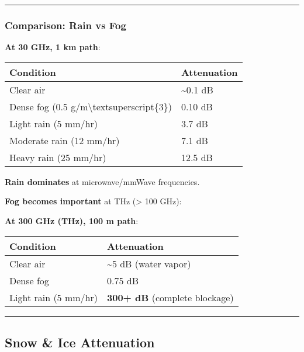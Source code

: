 \begin{center}\rule{0.5\linewidth}{0.5pt}\end{center}

\subsubsection{Comparison: Rain vs Fog}\label{comparison-rain-vs-fog}

\textbf{At 30 GHz, 1 km path}:

{\def\LTcaptype{} %
\begin{longtable}[]{@{}ll@{}}
\toprule\noalign{}
Condition & Attenuation \\
\midrule\noalign{}
\endhead
\bottomrule\noalign{}
\endlastfoot
Clear air & \textasciitilde0.1 dB \\
Dense fog (0.5 g/m\textbackslash textsuperscript\{3\}) & 0.10 dB \\
Light rain (5 mm/hr) & 3.7 dB \\
Moderate rain (12 mm/hr) & 7.1 dB \\
Heavy rain (25 mm/hr) & 12.5 dB \\
\end{longtable}
}

\textbf{Rain dominates} at microwave/mmWave frequencies.

\textbf{Fog becomes important} at THz (\textgreater{} 100 GHz):

\textbf{At 300 GHz (THz), 100 m path}:

{\def\LTcaptype{} %
\begin{longtable}[]{@{}ll@{}}
\toprule\noalign{}
Condition & Attenuation \\
\midrule\noalign{}
\endhead
\bottomrule\noalign{}
\endlastfoot
Clear air & \textasciitilde5 dB (water vapor) \\
Dense fog & 0.75 dB \\
Light rain (5 mm/hr) & \textbf{300+ dB} (complete blockage) \\
\end{longtable}
}

\begin{center}\rule{0.5\linewidth}{0.5pt}\end{center}

\subsection{Snow \& Ice Attenuation}\label{snow-ice-attenuation}

